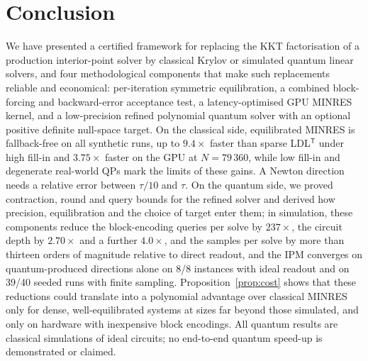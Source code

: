\documentclass[11pt]{article}
\theoremstyle{definition}
\newcommand{\T}{^{\mathsf T}}
\begin{document}
\section{Conclusion}\label{sec:conclusion}
We have presented a certified framework for replacing the KKT factorisation of a production interior-point solver by classical Krylov or simulated quantum linear solvers, and four methodological components that make such replacements reliable and economical: per-iteration symmetric equilibration, a combined block-forcing and backward-error acceptance test, a latency-optimised GPU MINRES kernel, and a low-precision refined polynomial quantum solver with an optional positive definite null-space target. On the classical side, equilibrated MINRES is fallback-free on all synthetic runs, up to $9.4\times$ faster than sparse LDL$\T$ under high fill-in and $3.75\times$ faster on the GPU at $N=79\,360$, while low fill-in and degenerate real-world QPs mark the limits of these gains. A Newton direction needs a relative error between $\tau/10$ and $\tau$. On the quantum side, we proved contraction, round and query bounds for the refined solver and derived how precision, equilibration and the choice of target enter them; in simulation, these components reduce the block-encoding queries per solve by $237\times$, the circuit depth by $2.70\times$ and a further $4.0\times$, and the samples per solve by more than thirteen orders of magnitude relative to direct readout, and the IPM converges on quantum-produced directions alone on 8/8 instances with ideal readout and on 39/40 seeded runs with finite sampling. Proposition~\ref{prop:cost} shows that these reductions could translate into a polynomial advantage over classical MINRES only for dense, well-equilibrated systems at sizes far beyond those simulated, and only on hardware with inexpensive block encodings. All quantum results are classical simulations of ideal circuits; no end-to-end quantum speed-up is demonstrated or claimed.

\appendix
\end{document}
